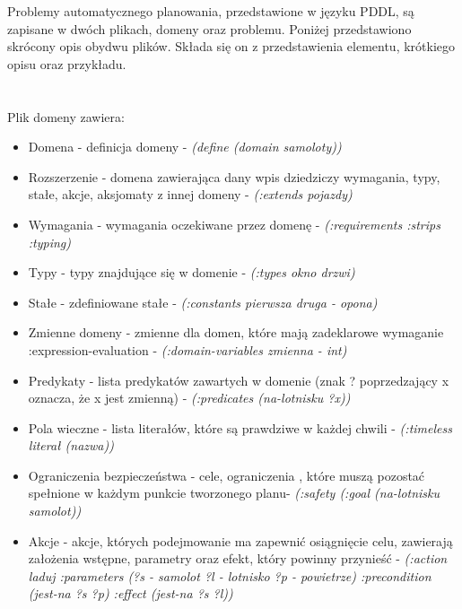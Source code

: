 Problemy automatycznego planowania, przedstawione w języku PDDL, są zapisane w dwóch plikach, domeny oraz problemu. Poniżej przedstawiono skrócony opis obydwu plików. Składa się on z przedstawienia elementu, krótkiego opisu oraz przykładu.
\\\\\\
Plik domeny zawiera:
  \begin{itemize}
\item Domena - definicja domeny - \textit{(define (domain samoloty))}
\item Rozszerzenie - domena zawierająca dany wpis dziedziczy wymagania, typy, stałe, akcje, aksjomaty z innej domeny - \textit{(:extends pojazdy) }
\item Wymagania - wymagania oczekiwane przez domenę - \textit{(:requirements :strips :typing)}
\item Typy - typy znajdujące się w domenie - \textit{(:types okno drzwi)}
\item Stałe - zdefiniowane stałe - \textit{(:constants pierwsza druga - opona)}
\item Zmienne domeny - zmienne dla domen, które mają zadeklarowe wymaganie :expression-evaluation - \textit{(:domain-variables zmienna - int)}
\item Predykaty - lista predykatów zawartych w domenie (znak ? poprzedzający x oznacza, że x jest zmienną) -  \textit{(:predicates (na-lotnisku ?x))}
\item Pola wieczne - lista literałów, które są prawdziwe w każdej chwili - \textit{(:timeless literał (nazwa))}
\item Ograniczenia bezpieczeństwa - cele, ograniczenia , które muszą pozostać spełnione w każdym punkcie tworzonego planu- \textit{(:safety (:goal (na-lotnisku samolot))}
\item Akcje - akcje, których podejmowanie ma zapewnić osiągnięcie celu, zawierają założenia wstępne, parametry oraz efekt, który powinny przynieść - \textit{(:action laduj :parameters (?s - samolot ?l - lotnisko ?p - powietrze) :precondition (jest-na ?s ?p) :effect (jest-na ?s ?l)) }\\
\end{itemize}


